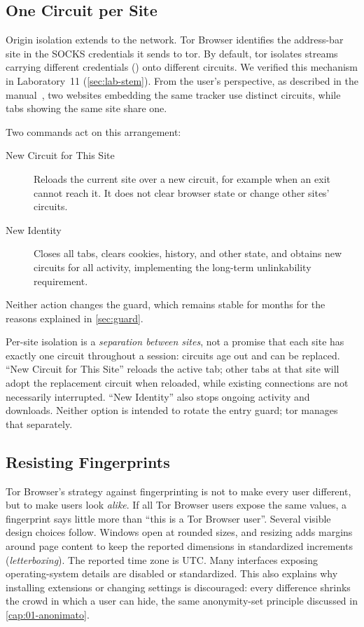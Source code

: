 \subsection{One Circuit per Site}

Origin isolation extends to the network. Tor Browser identifies the address-bar site in the SOCKS credentials it sends to tor. By default, tor isolates streams carrying different credentials () onto different circuits. We verified this mechanism in Laboratory~11 (\cref{sec:lab-stem}). From the user's perspective, as described in the manual~\cite{tbmanual}, two websites embedding the same tracker use distinct circuits, while tabs showing the same site share one.

Two commands act on this arrangement:
\begin{description}
  \item[New Circuit for This Site] Reloads the current site over a new circuit, for example when an exit cannot reach it. It does not clear browser state or change other sites' circuits.
  \item[New Identity] Closes all tabs, clears cookies, history, and other state, and obtains new circuits for all activity, implementing the long-term unlinkability requirement.
\end{description}
Neither action changes the guard, which remains stable for months for the reasons explained in \cref{sec:guard}.

Per-site isolation is a \emph{separation between sites}, not a promise that each site has exactly one circuit throughout a session: circuits age out and can be replaced. \enquote{New Circuit for This Site} reloads the active tab; other tabs at that site will adopt the replacement circuit when reloaded, while existing connections are not necessarily interrupted. \enquote{New Identity} also stops ongoing activity and downloads. Neither option is intended to rotate the entry guard; tor manages that separately.

\subsection{Resisting Fingerprints}

Tor Browser's strategy against fingerprinting is not to make every user different, but to make users look \emph{alike}. If all Tor Browser users expose the same values, a fingerprint says little more than \enquote{this is a Tor Browser user}. Several visible design choices follow. Windows open at rounded sizes, and resizing adds margins around page content to keep the reported dimensions in standardized increments (\emph{letterboxing}). The reported time zone is UTC. Many interfaces exposing operating-system details are disabled or standardized. This also explains why installing extensions or changing settings is discouraged: every difference shrinks the crowd in which a user can hide, the same anonymity-set principle discussed in \cref{cap:01-anonimato}.

